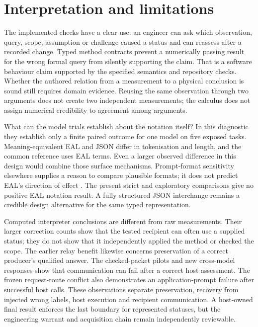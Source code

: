 \documentclass[preprint,12pt]{elsarticle}
\begin{document}
\section{Interpretation and limitations}\label{sec:discussion}
The implemented checks have a clear use: an engineer can ask which observation, query, scope, assumption or challenge caused a status and can reassess after a recorded change. Typed method contracts prevent a numerically passing result for the wrong formal query from silently supporting the claim. That is a software behaviour claim supported by the specified semantics and repository checks. Whether the authored relation from a measurement to a physical conclusion is sound still requires domain evidence. Reusing the same observation through two arguments does not create two independent measurements; the calculus does not assign numerical credibility to agreement among arguments.

What can the model trials establish about the notation itself? In this diagnostic they establish only a finite paired outcome for one model on five exposed tasks. Meaning-equivalent EAL and JSON differ in tokenisation and length, and the common reference uses EAL terms. Even a larger observed difference in this design would combine those surface mechanisms. Prompt-format sensitivity elsewhere supplies a reason to compare plausible formats; it does not predict EAL's direction of effect \citep{sclar2024}. The present strict and exploratory comparisons give no positive EAL notation result. A fully structured JSON interchange remains a credible design alternative for the same typed representation.

Computed interpreter conclusions are different from raw measurements. Their larger correction counts show that the tested recipient can often use a supplied status; they do not show that it independently applied the method or checked the scope. The earlier relay benefit likewise concerns preservation of a correct producer's qualified answer. The checked-packet pilots and new cross-model responses show that communication can fail after a correct host assessment. The frozen request-route conflict also demonstrates an application-prompt failure after successful host calls. These observations separate preservation, recovery from injected wrong labels, host execution and recipient communication. A host-owned final result enforces the last boundary for represented statuses, but the engineering warrant and acquisition chain remain independently reviewable.
\end{document}
